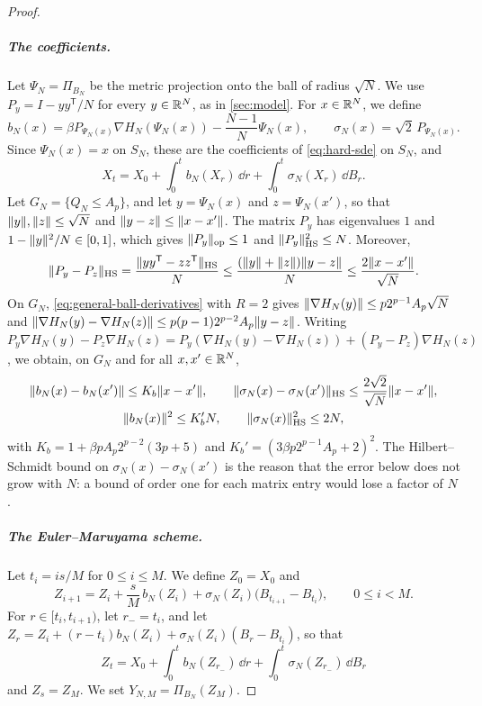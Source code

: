 \begin{proof}
\subparagraph{The coefficients.}
Let $\Psi_N=\Pi_{B_N}$ be the metric projection onto the ball of radius $\sqrt N$.
We use $P_y=I-yy^{\mathsf T}/N$ for every $y\in\mathbb R^N$, as in \cref{sec:model}.
For $x\in\mathbb R^N$, we define
\[
 b_N(x)=\beta P_{\Psi_N(x)}\nabla H_N(\Psi_N(x))-\frac{N-1}N\Psi_N(x),\qquad
 \sigma_N(x)=\sqrt2\,P_{\Psi_N(x)}.
\]
Since $\Psi_N(x)=x$ on $S_N$, these are the coefficients of
\eqref{eq:hard-sde} on $S_N$, and
\[
 X_t=X_0+\int_0^tb_N(X_r)\,\dd r+\int_0^t\sigma_N(X_r)\,\dd B_r.
\]
Let $G_N=\{Q_N\le A_p\}$, and let $y=\Psi_N(x)$ and $z=\Psi_N(x')$, so that
$\lVert y\rVert,\lVert z\rVert\le\sqrt N$ and $\lVert y-z\rVert\le\lVert x-x'\rVert$. The matrix $P_y$
has eigenvalues $1$ and $1-\lVert y\rVert^2/N\in[0,1]$, which gives
$\lVert P_y\rVert_{\mathrm{op}}\le1$ and $\lVert P_y\rVert_{\mathrm{HS}}^2\le N$. Moreover,
\[
 \lVert P_y-P_z\rVert_{\mathrm{HS}}=\frac{\lVert yy^{\mathsf T}-zz^{\mathsf T}\rVert_{\mathrm{HS}}}N
 \le\frac{(\lVert y\rVert+\lVert z\rVert)\lVert y-z\rVert}N\le\frac{2\lVert x-x'\rVert}{\sqrt N}.
\]
On $G_N$, \eqref{eq:general-ball-derivatives} with $R=2$ gives
$\lVert\nabla H_N(y)\rVert\le p2^{p-1}A_p\sqrt N$ and
$\lVert\nabla H_N(y)-\nabla H_N(z)\rVert\le p(p-1)2^{p-2}A_p\lVert y-z\rVert$. Writing
$P_y\nabla H_N(y)-P_z\nabla H_N(z)
=P_y(\nabla H_N(y)-\nabla H_N(z))+(P_y-P_z)\nabla H_N(z)$, we obtain, on
$G_N$ and for all $x,x'\in\mathbb R^N$,
\begin{equation}\label{eq:euler-coefficient-bounds}
\begin{gathered}
 \lVert b_N(x)-b_N(x')\rVert\le K_b\lVert x-x'\rVert,\qquad
 \lVert\sigma_N(x)-\sigma_N(x')\rVert_{\mathrm{HS}}\le\frac{2\sqrt2}{\sqrt N}\lVert x-x'\rVert,\\
 \lVert b_N(x)\rVert^2\le K_b'N,\qquad\lVert\sigma_N(x)\rVert_{\mathrm{HS}}^2\le2N,
\end{gathered}
\end{equation}
with $K_b=1+\beta pA_p2^{p-2}(3p+5)$ and
$K_b'=(3\beta p2^{p-1}A_p+2)^2$. The Hilbert--Schmidt bound on
$\sigma_N(x)-\sigma_N(x')$ is the reason that the error below does not grow with $N$: a bound of order one for each matrix entry would lose a factor of
$N$.

\subparagraph{The Euler--Maruyama scheme.}
Let $t_i=is/M$ for $0\le i\le M$. We define $Z_0=X_0$ and
\[
 Z_{i+1}=Z_i+\frac sM\,b_N(Z_i)+\sigma_N(Z_i)\big(B_{t_{i+1}}-B_{t_i}\big),
 \qquad 0\le i<M.
\]
For $r\in[t_i,t_{i+1})$, let $r_-=t_i$, and let
$Z_r=Z_i+(r-t_i)b_N(Z_i)+\sigma_N(Z_i)(B_r-B_{t_i})$, so that
\[
 Z_t=X_0+\int_0^tb_N(Z_{r_-})\,\dd r+\int_0^t\sigma_N(Z_{r_-})\,\dd B_r
\]
and $Z_s=Z_M$. We set $Y_{N,M}=\Pi_{B_N}(Z_M)$.


\end{proof}
